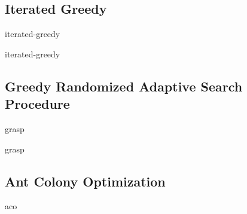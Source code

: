 \subsection{Iterated Greedy}
\label{subsec:iterated-greedy}

\acrfull{iterated-greedy}~\cite{stutzle2018iterated,outeiro2021application}

\begin{algorithm}
  \label{algorithm:iterated-greedy}
  \caption{\acrlong{iterated-greedy}}
  
\end{algorithm}

\subsection{Greedy Randomized Adaptive Search Procedure}
\label{subsec:grasp}

\acrfull{grasp}~\cite{resende2010greedya,outeiro2021application,blum2003metaheuristics}


\begin{algorithm}
  \label{algorithm:grasp}
  \caption{\acrlong{grasp}}
  
\end{algorithm}

\subsection{Ant Colony Optimization}
\label{subsec:aco}

\acrfull{aco}~\cite{dorigo2010anta,outeiro2021application,luke2013essentialsa,blum2003metaheuristics}

